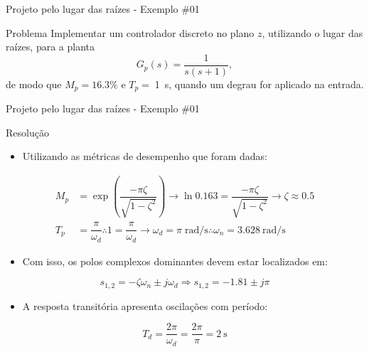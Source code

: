 \begin{frame}{Projeto pelo lugar das raízes - Exemplo \#01}
\begin{block}{Problema}
	Implementar um controlador discreto no plano $z$, utilizando o lugar das raízes, para a planta
	$$ G_p(s)=\dfrac{1}{s(s+1)}, $$
	de modo que $ M_p=\num{16,3}\% $ e $ T_p=\; $\SI{1}{\second}, quando um degrau for aplicado na entrada.
\end{block}
\end{frame}

\begin{frame}{Projeto pelo lugar das raízes - Exemplo \#01}
\begin{block}{Resolução}
\begin{itemize}
    \item Utilizando as métricas de desempenho que foram dadas:
\end{itemize}
	\begin{align*}
		M_p&=\exp{\left( \dfrac{-\pi\zeta}{\sqrt{1-\zeta^{2}}}\right) }\rightarrow \ln\num{0,163}=\dfrac{-\pi\zeta}{\sqrt{1-\zeta^{2}}}\rightarrow\zeta\approx\num{0,5}\\
		T_p&=\dfrac{\pi}{\omega_d}\therefore 1=\dfrac{\pi}{\omega_d}\rightarrow\omega_d=\pi\;\si{\radian\per\second}\therefore\omega_n=\SI{3,628}{\radian\per\second}
	\end{align*}
\begin{itemize}
    \item Com isso, os polos complexos dominantes devem estar localizados em:
\end{itemize}
	
	\[ s_{1,2}=-\zeta\omega_n\pm j\omega_d\Rightarrow s_{1,2}=-\num{1,81}\pm j\pi \]

\begin{itemize}
    \item A resposta transitória apresenta oscilações com período:
\end{itemize}

	\[ T_d=\dfrac{2\pi}{\omega_d}=\dfrac{2\pi}{\pi}=\SI{2}{\second} \]
\end{block}
\end{frame}

